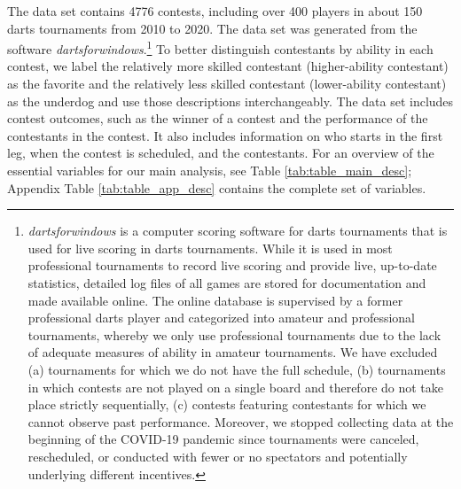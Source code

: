 \documentclass[11pt,a4paper]{article}
\begin{document}
The data set contains 4776 contests, including over 400 players in about 150 darts tournaments from 2010 to 2020. The data set was generated from the software \textit{dartsforwindows}.\footnote{\textit{dartsforwindows} is a computer scoring software for darts tournaments that is used for live scoring in darts tournaments. While it is used in most professional tournaments to record live scoring and provide live, up-to-date statistics, detailed log files of all games are stored for documentation and made available online. The online database is supervised by a former professional darts player and categorized into amateur and professional tournaments, whereby we only use professional tournaments due to the lack of adequate measures of ability in amateur tournaments. We have excluded (a) tournaments for which we do not have the full schedule, (b) tournaments in which contests are not played on a single board and therefore do not take place strictly sequentially, (c) contests featuring contestants for which we cannot observe past performance. Moreover, we stopped collecting data at the beginning of the COVID-19 pandemic since tournaments were canceled, rescheduled, or conducted with fewer or no spectators and potentially underlying different incentives.} To better distinguish contestants by ability in each contest, we label the relatively more skilled contestant (higher-ability contestant) as the favorite and the relatively less skilled contestant (lower-ability contestant) as the underdog and use those descriptions interchangeably. The data set includes contest outcomes, such as the winner of a contest and the performance of the contestants in the contest. It also includes information on who starts in the first leg, when the contest is scheduled, and the contestants. For an overview of the essential variables for our main analysis, see Table \ref{tab:table_main_desc}; Appendix Table \ref{tab:table_app_desc} contains the complete set of variables.\par
\end{document}
